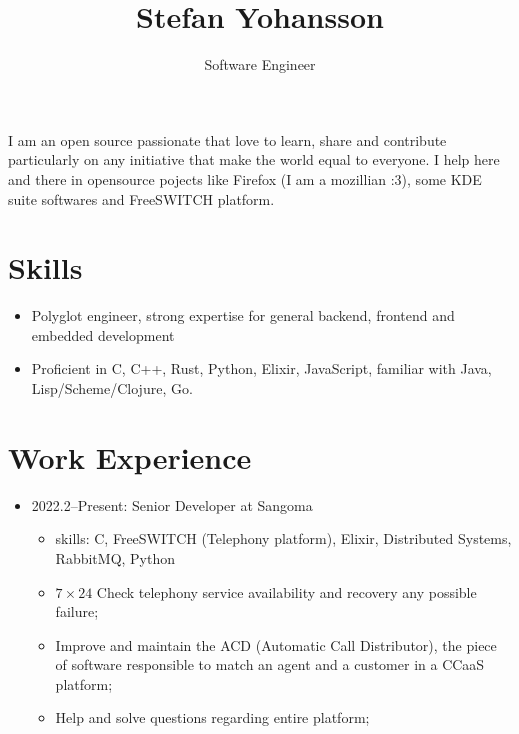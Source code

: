 \documentclass[
]{article}
\title{Stefan Yohansson}
\subtitle{Software Engineer}
\author{}
\date{}
\providecommand{\tightlist}{%
  \setlength{\itemsep}{0pt}\setlength{\parskip}{0pt}}
\begin{document}
\maketitle

I am an open source passionate that love to learn, share and contribute
particularly on any initiative that make the world equal to everyone. I
help here and there in opensource pojects like Firefox (I am a mozillian
:3), some KDE suite softwares and FreeSWITCH platform.

\hypertarget{skills}{%
\section{Skills}\label{skills}}

\begin{itemize}
\tightlist
\item
  Polyglot engineer, strong expertise for general backend, frontend and
  embedded development
\item
  Proficient in C, C++, Rust, Python, Elixir, JavaScript, familiar with
  Java, Lisp/Scheme/Clojure, Go.
\end{itemize}

\hypertarget{work-experience}{%
\section{Work Experience}\label{work-experience}}

\begin{itemize}
\tightlist
\item
  2022.2--Present: Senior Developer at Sangoma

  \begin{itemize}
  \tightlist
  \item
    skills: C, FreeSWITCH (Telephony platform), Elixir, Distributed
    Systems, RabbitMQ, Python
  \item
    \(7 \times 24\) Check telephony service availability and recovery
    any possible failure;
  \item
    Improve and maintain the ACD (Automatic Call Distributor), the piece
    of software responsible to match an agent and a customer in a CCaaS
    platform;
  \item
    Help and solve questions regarding entire platform;
  \end{itemize}
\end{itemize}

\vspace{2mm}
\end{document}
